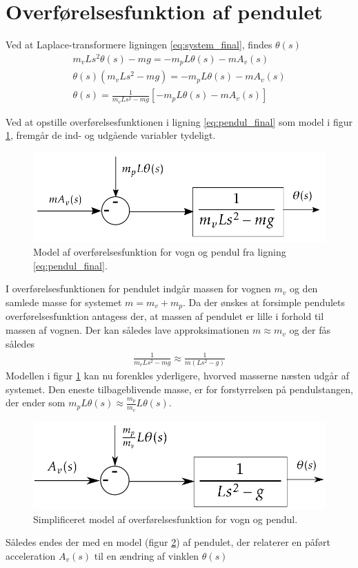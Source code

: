 \section{Overførelsesfunktion af pendulet}\label{sec:sec_penduloverforelse}
Ved at Laplace-transformere ligningen \ref{eq:system_final}, findes $\theta(s)$
\begin{align}
 m_vLs^2\theta(s) - mg = -m_pL\theta(s) -mA_v(s) \\
 \theta(s)\left(m_vLs^2 - mg \right) = -m_pL\theta(s) -mA_v(s) \\
 \theta(s) = \frac{1}{m_vLs^2 - mg }\left[-m_pL\theta(s) -mA_v(s)\right] \label{eq:pendul_final}
\end{align} 
 
Ved at opstille overførelsesfunktionen i ligning \ref{eq:pendul_final} som model i figur \ref{fig:pendul_trans1}, fremgår de ind- og udgående variabler tydeligt. 

\begin{figure}[h!]
	\centering
	\includegraphics[width=.6\textwidth]{billeder/pendul_trans1.png}
	\caption[Model af overførelsesfunktion for vogn og pendul.]{Model af overførelsesfunktion for vogn og pendul fra ligning \ref{eq:pendul_final}.}
	\label{fig:pendul_trans1}
\end{figure}
\FloatBlock

I overførelsesfunktionen for pendulet indgår massen for vognen $m_v$ og den samlede masse for systemet $m = m_v + m_p$.
Da der ønskes at forsimple pendulets overførelsesfunktion antagess der, at massen af pendulet er lille i forhold til massen af vognen. 
Der kan således lave approksimationen $m \approx m_v$ og der fås således
\begin{align}
\frac{1}{m_vLs^2 - mg } \approx  \frac{1}{m \left( Ls^2 - g \right) } 
\end{align}
Modellen i figur \ref{fig:pendul_trans1} kan nu forenkles yderligere, hvorved masserne næsten udgår af systemet.
Den eneste tilbageblivende masse, er for forstyrrelsen på pendulstangen, der ender som $m_pL\theta(s) \approx  \frac{m_p}{m_v}L\theta(s) $.

\begin{figure}[h!]
	\centering
	\includegraphics[width=.6\textwidth]{billeder/pendul_trans_clean.png}
	\caption{Simplificeret model af overførelsesfunktion for vogn og pendul.}
	\label{fig:pendul_trans_clean}
\end{figure}
\FloatBlock 
Således endes der med en model (figur \ref{fig:pendul_trans_clean}) af pendulet, der relaterer en påført acceleration $A_v(s)$ til en ændring af vinklen $\theta(s)$
